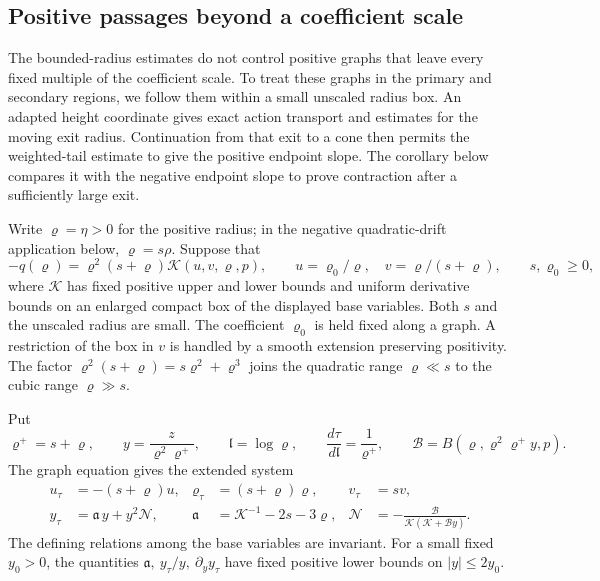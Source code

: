 \subsection{Positive passages beyond a coefficient scale}
\label{sec:direct-adaptive-positive}

The bounded-radius estimates do not control positive graphs that leave
every fixed multiple of the coefficient scale. To treat these graphs
in the primary and secondary regions, we follow them within a small
unscaled radius box. An adapted height coordinate gives exact action
transport and estimates for the moving exit radius. Continuation from
that exit to a cone then permits the weighted-tail estimate to give
the positive endpoint slope. The corollary below compares it with the
negative endpoint slope to prove contraction after a sufficiently
large exit.

Write \(\varrho=\eta>0\) for the positive radius; in the negative
quadratic-drift application below, \(\varrho=s\rho\). Suppose that
\begin{equation}
\label{eq:direct-adaptive-drift}
 -q(\varrho)=\varrho^2(s+\varrho)\mathcal K(u,v,\varrho,p),\qquad
 u=\varrho_0/\varrho,\quad v=\varrho/(s+\varrho),\qquad s,\varrho_0\ge0,
\end{equation}
where \(\mathcal K\) has fixed positive upper and lower bounds
and uniform derivative bounds on an enlarged compact box of
the displayed base variables. Both \(s\) and the unscaled radius
are small. The coefficient \(\varrho_0\) is held fixed along a graph.
A restriction of the box in \(v\) is handled by a smooth
extension preserving positivity.
The factor \(\varrho^2(s+\varrho)=s\varrho^2+\varrho^3\) joins the
quadratic range \(\varrho\ll s\) to the cubic range
\(\varrho\gg s\).

Put
\[
 \varrho^+=s+\varrho,\qquad y=\frac{z}{\varrho^2\varrho^+},\qquad \mathfrak l=\log\varrho,
 \qquad \frac{d\tau}{d\mathfrak l}=\frac1{\varrho^+},\qquad
 \mathcal B=B(\varrho,\varrho^2\varrho^+y,p).
\]
The graph equation gives the extended system
\begin{equation}
\label{eq:direct-adaptive-system}
 \begin{aligned}
 u_\tau&=-(s+\varrho)u,& \varrho_\tau&=(s+\varrho)\varrho,& v_\tau&=sv,\\
 y_\tau&=\mathfrak a\,y+y^2\mathcal N,&
 \mathfrak a&=\mathcal K^{-1}-2s-3\varrho,&
 \mathcal N&=-\frac{\mathcal B}{\mathcal K(\mathcal K+\mathcal B y)} .
 \end{aligned}
\end{equation}
The defining relations among the base variables are invariant.
For a small fixed \(y_0>0\), the quantities
\(\mathfrak a,\ y_\tau/y,\ \partial_y y_\tau\) have fixed
positive lower bounds on \(|y|\le2y_0\).

